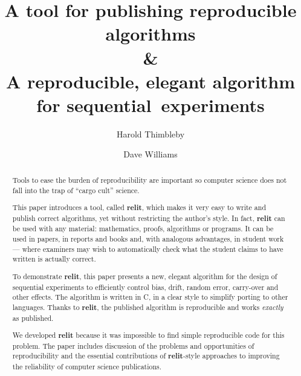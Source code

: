\documentclass[preprint,times]{elsarticle}
\newif\ifnew
\def\newstart{\color{red}}
\def\newend{\color{black}}
\def\new#1{#1}
\def\newstart{}
\def\newend{}
\def\name#1{\textbf{#1}}
\begin{document}
\title{A tool for publishing reproducible algorithms\\
\&\\
A reproducible, elegant algorithm for sequential~experiments
}

\author[swansea]{Harold Thimbleby}

\author[swansea]{Dave Williams}

\address[swansea]{Swansea University, Wales, SA2 8PP}

\ifnew \noindent Note. Improvements and other responses to referees' comments are highlighted in \new{red}. We have done this with a \LaTeX\ macro, so reversion to black will be a trivial edit to the paper.\fi

\begin{abstract}
Tools to ease the burden of reproducibility are important so computer science does not fall into the trap of ``cargo cult'' science. 

\newstart This paper introduces a  tool, called \name{relit}, which makes it very easy to write and publish correct algorithms, yet without restricting the author's style. In fact, \name{relit} can be used with any material: mathematics, proofs, algorithms or programs. It can be used in papers, in reports and books and, with analogous advantages, in student work --- where examiners may wish to automatically check what the student claims to have written is actually correct.

To demonstrate \name{relit}, this paper presents a new, elegant algorithm 
for the design of sequential experiments to efficiently control bias, drift, random error, carry-over and other effects. The algorithm is written in C, in a clear style to simplify porting to other languages. Thanks to \name{relit}, the published algorithm is reproducible and works \emph{exactly\/} as published. 

We developed \name{relit} because it was impossible to find simple reproducible code for this problem. The paper includes discussion of the problems and opportunities of reproducibility and the essential contributions of \name{relit}-style approaches to improving the reliability of computer science publications.\newend
\end{abstract}
\end{document}
